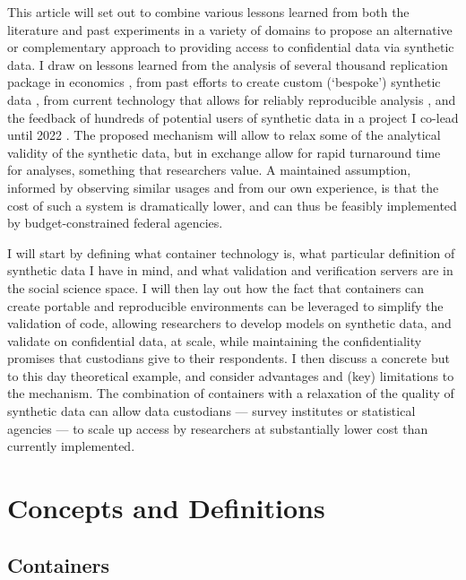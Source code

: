 \documentclass[]{hdsr}
\begin{document}
This article will set out to combine various lessons learned from both the literature and past experiments in a variety of domains to propose an alternative or complementary approach to providing access to confidential data via synthetic data. I draw on lessons learned from the analysis of several thousand replication package in economics \citep{vilhuber_report_2025}, from past efforts to create custom (`bespoke') synthetic data \citep{nowok_providing_2017}, from current technology that allows for reliably reproducible analysis \citep[\textbf{containers}, see ][for an introduction]{boettiger_introduction_2015}, and the feedback of hundreds of potential users of synthetic data in a project I co-lead until 2022 \citep{vilhuber_end_2022}. The proposed mechanism will allow to relax some of the analytical validity of the synthetic data, but in exchange allow for rapid turnaround time for analyses, something that researchers value. A maintained assumption, informed by observing similar usages and from our own experience, is that the cost of such a system is dramatically lower, and can thus be feasibly implemented by budget-constrained federal agencies. 


I will start by defining what container technology is, what particular definition of synthetic data I have in mind, and what validation and verification servers are in the social science space. I will then lay out how the fact that containers can create portable and reproducible environments can be leveraged to simplify the validation of code, allowing researchers to develop models on synthetic data, and validate on confidential data, at scale, while maintaining the confidentiality promises that custodians give to their respondents. I then discuss a concrete but to this day theoretical example, and consider advantages and (key) limitations to the mechanism. The combination of containers with a relaxation of the quality of synthetic data can allow data custodians --- survey institutes or statistical agencies --- to scale up access by researchers at substantially lower cost than currently implemented.

\section{Concepts and Definitions}

\subsection{Containers}
\end{document}
